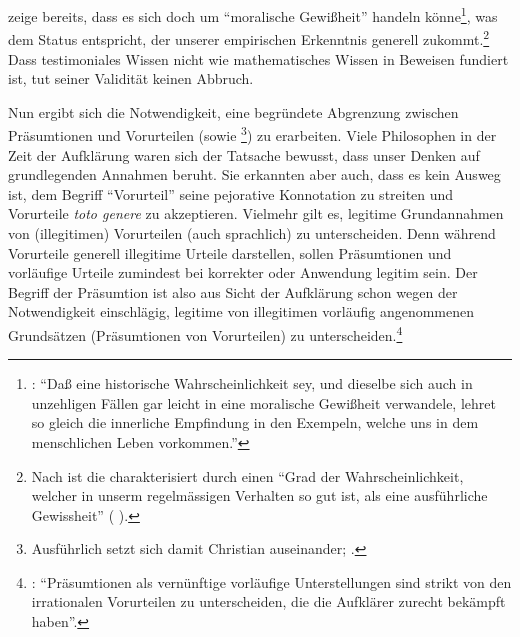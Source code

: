 zeige bereits, dass es sich doch um \enquote{moralische Gewißheit} handeln
könne\footnote{\cite[Vgl.][\S~605]{Crusius:WegzurGewissheitundZuverlaessigkeitdermenschlichenErkenntniss1965}:
\enquote{Daß eine historische Wahrscheinlichkeit sey, und dieselbe sich auch in
unzehligen Fällen gar leicht in eine moralische Gewißheit verwandele, lehret so
gleich die innerliche Empfindung in den Exempeln, welche uns in dem menschlichen
Leben vorkommen.}}, was dem Status entspricht, der unserer empirischen
Erkenntnis generell zukommt.\footnote{Nach 
ist die  charakterisiert durch einen
\enquote{Grad der Wahrscheinlichkeit, welcher in unserm regelmässigen
Verhalten so gut ist, als eine ausführliche Gewissheit}
\mkbibparens{\cite[][\pno~48\,f.,]{Meier:AuszugausderVernunftlehre1752}
\cite[][XVI: 432.23--24]{Kant:GesammelteWerke1900ff.}}.} Dass testimoniales
Wissen nicht wie mathematisches Wissen in Beweisen fundiert ist, tut seiner Validität keinen Abbruch.


Nun ergibt sich die Notwendigkeit, eine begründete Abgrenzung
zwischen Präsumtionen und Vorurteilen (sowie
\footnote{Ausführlich setzt sich damit Christian
 auseinander; \cite[vgl.][\S\S~125--129]{Wolff:Discursuspraeliminarisdephilosophiaingenere1996}.}) zu
erarbeiten. Viele Philosophen in der Zeit der Aufklärung waren sich der Tatsache
bewusst, dass unser Denken auf grundlegenden Annahmen beruht. Sie erkannten aber auch, dass es kein
Ausweg ist, dem Begriff \enquote{Vorurteil} seine pejorative Konnotation zu
streiten und Vorurteile \emph{toto genere} zu akzeptieren. Vielmehr gilt es,
legitime Grundannahmen von (illegitimen) Vorurteilen (auch sprachlich) zu
unterscheiden. Denn während Vorurteile generell illegitime Urteile darstellen,
sollen Präsumtionen und vorläufige Urteile zumindest bei korrekter oder
 Anwendung legitim sein. Der Begriff der
Präsumtion ist also aus Sicht der Aufklärung schon wegen der Notwendigkeit
einschlägig, legitime von illegitimen vorläufig angenommenen
Grundsätzen (Präsumtionen von Vorurteilen) zu
unterscheiden.\footnote{\cite[Vgl.][44]{Scholz:VerstehenundRationalitaet1999}:
\enquote{Präsumtionen als vernünftige vorläufige Unterstellungen sind
strikt von den irrationalen Vorurteilen zu unterscheiden, die die Aufklärer
zurecht bekämpft haben}.}

